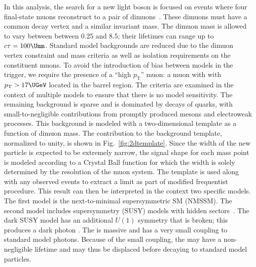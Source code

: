 \newcommand{\TgammaDark}{\ensuremath{\tau_{{\PGg}_{\mathrm{D}}}}\xspace}


\newcommand{\ratio}{\ensuremath{\overline{r}}\xspace}
\newcommand{\alphaGen}{\ensuremath{\alpha_\text{gen}}\xspace}
\newcommand{\epsilonFull}{\ensuremath{\varepsilon_{\text{full}}}\xspace}
\newcommand{\SOne}{\ensuremath{S_\mathrm{I}(\Mdimuon)}\xspace}
\newcommand{\STwo}{\ensuremath{S_\mathrm{II}(\Mdimuon)}\xspace}
\newcommand{\ASR}{\ensuremath{A_{\mathrm{SR}}}\xspace}
\newcommand{\ACR}{\ensuremath{A_{\mathrm{CR}}}\xspace}
\newcommand{\fSPS}{\ensuremath{f_\mathrm{SPS}}\xspace}

In this analysis, the search for a new light boson is focused on events where four final-state muons reconstruct to a pair of dimuons~\cite{CMS-PAS-HIG-18-003}. These dimuons must have a common decay vertex and a similar invariant mass. The dimuon mass is allowed to vary between between 0.25 and 8.5\UGeV; their lifetimes can range up to $c\tau=100\Umm$. Standard model backgrounds are reduced due to the dimuon vertex constraint and mass criteria as well as isolation requirements on the constituent muons. To avoid the introduction of bias between models in the trigger, we require the presence of a ``high $p_\mathrm{T}$'' muon: a muon with with $p_\mathrm{T} > 17\UGeV$ located in the barrel region. The criteria are examined in the context of multiple models to ensure that there is no model sensitivity. The remaining background is sparse and is dominated by decays of \bbbar quarks, with small-to-negligible contributions from promptly produced \JPsi mesons and electroweak processes. This background is modeled with a two-dimensional template as a function of dimuon mass. The \bbbar contribution to the background template, normalized to unity, is shown in Fig.~\ref{fig:2dtemplate}. Since the width of the new particle is expected to be extremely narrow, the signal shape for each mass point is modeled according to a Crystal Ball \cite{Oreglia:1980cs} function for which the width is solely determined by the resolution of the muon system. The template is used along with any observed events to extract a limit as part of modified frequentist procedure. This result can then be interpreted in the context two specific models. The first model is the next-to-minimal supersymmetric SM (NMSSM). The second model includes supersymmetry (SUSY) models with hidden sectors~\cite{ArkaniHamed:2008qn, Baumgart:2009tn, Falkowski:2010cm}. The dark SUSY model has an additional $U(1)$ symmetry that is broken; this produces a dark photon \gammaDark. The \gammaDark is massive and has a very small coupling to standard model photons. Because of the small coupling, the \gammaDark may have a non-negligible lifetime and may thus be displaced before decaying to standard model particles.

